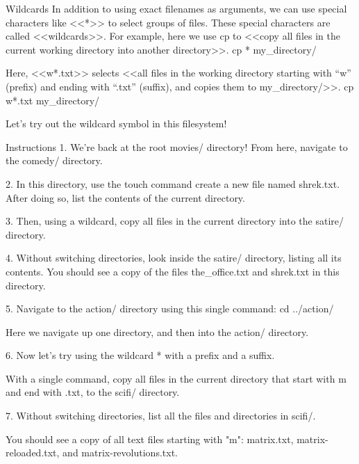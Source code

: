 Wildcards
    In addition to using exact filenames as arguments, we can use special characters like <<*>> to select groups of files. These special characters are called <<wildcards>>. For example, here we use cp to <<copy all files in the current working directory into another directory>>.
        cp * my_directory/
    
    Here, <<w*.txt>> selects <<all files in the working directory starting with “w” (prefix) and ending with “.txt” (suffix), and copies them to my_directory/>>.
        cp w*.txt my_directory/
    
    Let’s try out the wildcard symbol in this filesystem!

Instructions
    1.
    We’re back at the root movies/ directory! From here, navigate to the comedy/ directory.

    2.
    In this directory, use the touch command create a new file named shrek.txt. After doing so, list the contents of the current directory.

    3.
    Then, using a wildcard, copy all files in the current directory into the satire/ directory.

    4.
    Without switching directories, look inside the satire/ directory, listing all its contents. You should see a copy of the files the_office.txt and shrek.txt in this directory.

    5.
    Navigate to the action/ directory using this single command:
       cd ../action/ 
    
    Here we navigate up one directory, and then into the action/ directory.

    6.
    Now let’s try using the wildcard * with a prefix and a suffix.

    With a single command, copy all files in the current directory that start with m and end with .txt, to the scifi/ directory.

    7.
    Without switching directories, list all the files and directories in scifi/.

    You should see a copy of all text files starting with "m": matrix.txt, matrix-reloaded.txt, and matrix-revolutions.txt.